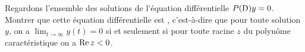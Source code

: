 
\begin{exercice}\label{exoEqsDiff0016}

Regardons l'ensemble des solutions de l'équation différentielle $P({\rm D})y =0$. Montrer que cette équation différentielle est , c'est-à-dire que pour toute solution $y$, on a $\lim_{t \to \infty} y(t) = 0$ si et seulement si pour toute racine $z$ du polynôme caractéristique on a ${\rm Re}\, z <0$.

\end{exercice}
